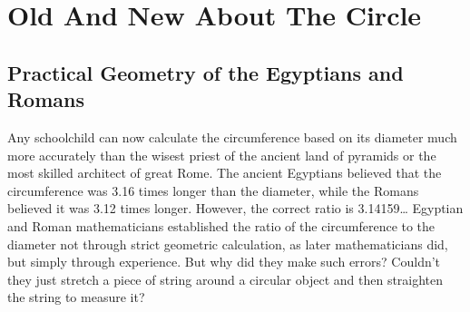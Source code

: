 



\chapter{Old And New About The Circle}
\label{ch-09}



\section{Practical Geometry of the Egyptians and Romans}
\label{sec-9.1}

Any schoolchild can now calculate the circumference based on its diameter much more accurately than the wisest priest of the ancient land of pyramids or the most skilled architect of great Rome. The ancient Egyptians believed that the circumference was 3.16 times longer than the diameter, while the Romans believed it was 3.12 times longer. However, the correct ratio is 3.14159\dots{} Egyptian and Roman mathematicians established the ratio of the circumference to the diameter not through strict geometric calculation, as later mathematicians did, but simply through experience. But why did they make such errors? Couldn't they just stretch a piece of string around a circular object and then straighten the string to measure it?

